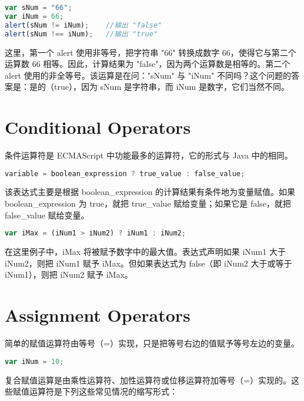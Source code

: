 \begin{lstlisting}[language=JavaScript]
var sNum = "66";
var iNum = 66;
alert(sNum != iNum);	//输出 "false"
alert(sNum !== iNum);	//输出 "true"
\end{lstlisting}


这里，第一个 alert 使用非等号，把字符串 "66" 转换成数字 66，使得它与第二个运算数 66 相等。因此，计算结果为 "false"，因为两个运算数是相等的。第二个 alert 使用的非全等号。该运算是在问："sNum" 与 "iNum" 不同吗？这个问题的答案是：是的（true），因为 sNum 是字符串，而 iNum 是数字，它们当然不同。





\chapter{Conditional Operators}

条件运算符是 ECMAScript 中功能最多的运算符，它的形式与 Java 中的相同。

\begin{lstlisting}[language=JavaScript]
variable = boolean_expression ? true_value : false_value;
\end{lstlisting}


该表达式主要是根据 boolean\_expression 的计算结果有条件地为变量赋值。如果 boolean\_expression 为 true，就把 true\_value 赋给变量；如果它是 false，就把 false\_value 赋给变量。


\begin{lstlisting}[language=JavaScript]
var iMax = (iNum1 > iNum2) ? iNum1 : iNum2;
\end{lstlisting}


在这里例子中，iMax 将被赋予数字中的最大值。表达式声明如果 iNum1 大于 iNum2，则把 iNum1 赋予 iMax。但如果表达式为 false（即 iNum2 大于或等于 iNum1），则把 iNum2 赋予 iMax。



\chapter{Assignment Operators}


简单的赋值运算符由等号（=）实现，只是把等号右边的值赋予等号左边的变量。


\begin{lstlisting}[language=JavaScript]
var iNum = 10;
\end{lstlisting}

复合赋值运算是由乘性运算符、加性运算符或位移运算符加等号（=）实现的。这些赋值运算符是下列这些常见情况的缩写形式：

